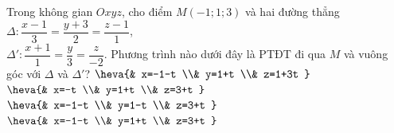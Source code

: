 \begin{ex}%
Trong không gian $Oxyz$, cho điểm $M(-1;1;3)$ và hai đường thẳng $\Delta \colon \dfrac{x-1}{3}=\dfrac{y+3}{2}=\dfrac{z-1}{1}$, \\
$\Delta' \colon \dfrac{x+1}{1}=\dfrac{y}{3}=\dfrac{z}{-2}$. Phương trình nào dưới đây là PTĐT đi qua $M$ và vuông góc với $\Delta$ và $\Delta'$?
\choice
{$\heva{& x=-1-t \\& y=1+t \\& z=1+3t }$}
{$\heva{& x=-t \\& y=1+t \\& z=3+t }$}
{$\heva{& x=-1-t \\& y=1-t \\& z=3+t }$}
{\True $\heva{& x=-1-t \\& y=1+t \\& z=3+t }$}
\end{ex}


